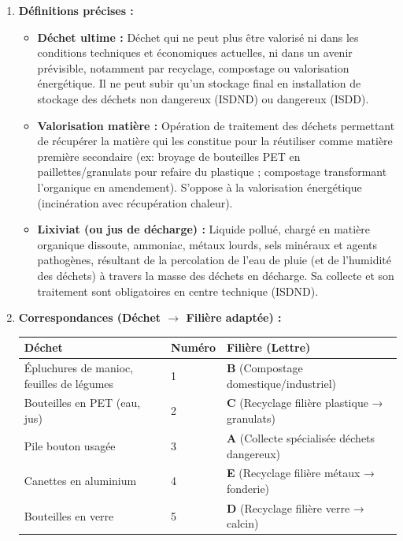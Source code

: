 \documentclass[11pt]{article}
\begin{document}
\begin{corrige}
\begin{enumerate}
    \item \textbf{Définitions précises :}
    \begin{itemize}
        \item \textbf{Déchet ultime :} Déchet qui ne peut plus être valorisé ni dans les conditions techniques et économiques actuelles, ni dans un avenir prévisible, notamment par recyclage, compostage ou valorisation énergétique. Il ne peut subir qu'un stockage final en installation de stockage des déchets non dangereux (ISDND) ou dangereux (ISDD).
        \item \textbf{Valorisation matière :} Opération de traitement des déchets permettant de récupérer la matière qui les constitue pour la réutiliser comme matière première secondaire (ex: broyage de bouteilles PET en paillettes/granulats pour refaire du plastique ; compostage transformant l'organique en amendement). S'oppose à la valorisation énergétique (incinération avec récupération chaleur).
        \item \textbf{Lixiviat (ou jus de décharge) :} Liquide pollué, chargé en matière organique dissoute, ammoniac, métaux lourds, sels minéraux et agents pathogènes, résultant de la percolation de l'eau de pluie (et de l'humidité des déchets) à travers la masse des déchets en décharge. Sa collecte et son traitement sont obligatoires en centre technique (ISDND).
    \end{itemize}

    \item \textbf{Correspondances (Déchet $\rightarrow$ Filière adaptée) :}
    \begin{center}
        \begin{tabular}{|l|l|l|}
            \hline
            \textbf{Déchet} & \textbf{Numéro} & \textbf{Filière (Lettre)} \\ \hline
            Épluchures de manioc, feuilles de légumes & 1 & \textbf{B} (Compostage domestique/industriel) \\ \hline
            Bouteilles en PET (eau, jus) & 2 & \textbf{C} (Recyclage filière plastique → granulats) \\ \hline
            Pile bouton usagée & 3 & \textbf{A} (Collecte spécialisée déchets dangereux) \\ \hline
            Canettes en aluminium & 4 & \textbf{E} (Recyclage filière métaux → fonderie) \\ \hline
            Bouteilles en verre & 5 & \textbf{D} (Recyclage filière verre → calcin) \\ \hline
        \end{tabular}
    \end{center}
\end{enumerate}
\end{corrige}
\end{document}
